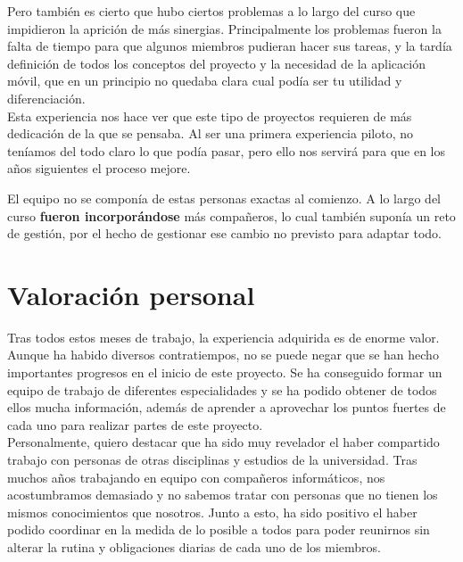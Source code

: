 Pero también es cierto que hubo ciertos problemas a lo largo del curso que impidieron la aprición de más sinergias. Principalmente los problemas fueron la falta de tiempo para que algunos miembros pudieran hacer sus tareas, y la tardía definición de todos los conceptos del proyecto y la necesidad de la aplicación móvil, que en un principio no quedaba clara cual podía ser tu utilidad y diferenciación.\\

Esta experiencia nos hace ver que este tipo de proyectos requieren de más dedicación de la que se pensaba. Al ser una primera experiencia piloto, no teníamos del todo claro lo que podía pasar, pero ello nos servirá para que en los años siguientes el proceso mejore.









El equipo no se componía de estas personas exactas al comienzo. A lo largo del curso \textbf{fueron incorporándose} más compañeros, lo cual también suponía un reto de gestión, por el hecho de gestionar ese cambio no previsto para adaptar todo.\\











\section{Valoración personal}
Tras todos estos meses de trabajo, la experiencia adquirida es de enorme valor. Aunque ha habido diversos contratiempos, no se puede negar que se han hecho importantes progresos en el inicio de este proyecto. Se ha conseguido formar un equipo de trabajo de diferentes especialidades y se ha podido obtener de todos ellos mucha información, además de aprender a aprovechar los puntos fuertes de cada uno para realizar partes de este proyecto.\\

Personalmente, quiero destacar que ha sido muy revelador el haber compartido trabajo con personas de otras disciplinas y estudios de la universidad. Tras muchos años trabajando en equipo con compañeros informáticos, nos acostumbramos demasiado y no sabemos tratar con personas que no tienen los mismos conocimientos que nosotros. Junto a esto, ha sido positivo el haber podido coordinar en la medida de lo posible a todos para poder reunirnos sin alterar la rutina y obligaciones diarias de cada uno de los miembros.\\

